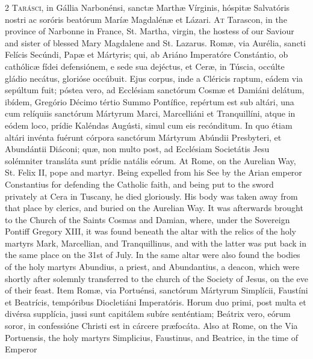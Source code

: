 \begin{paracol}{2}
\lettrine[lines=2]{T}{arásci,} in Gállia 
 Narbonénsi, sanctæ Marthæ Vírginis, hóspitæ Salvatóris nostri ac soróris 
 beatórum Maríæ Magdalénæ et Lázari.
\switchcolumn
{}
\lettrine[lines=2]{A}{t} Tarascon, in the province of 
 Narbonne in France, St. Martha, virgin, the hostess of our Saviour and 
 sister of blessed Mary Magdalene and St. Lazarus.
\switchcolumn*
{}
Romæ, via Aurélia, sancti Felícis Secúndi, Papæ et Mártyris; qui, ab Ariáno Imperatóre 
 Constántio, ob cathólicæ fídei defensiónem, e sede sua dejéctus, et 
 Ceræ, in Túscia, occúlte gládio necátus, glorióse occúbuit. Ejus 
 corpus, inde a Cléricis raptum, eádem via sepúltum fuit; póstea vero, ad 
 Ecclésiam sanctórum Cosmæ et Damiáni delátum, ibídem, Gregório Décimo tértio 
 Summo Pontífice, repértum est sub altári, una cum relíquiis sanctórum 
 Mártyrum Marci, Marcelliáni et Tranquillíni, atque in eódem loco, prídie 
 Kaléndas Augústi, simul cum eis recónditum. In quo étiam altári 
 invénta fuérunt córpora sanctórum Mártyrum Abúndii Presbyteri, et Abundántii 
 Diáconi; quæ, non multo post, ad Ecclésiam Societátis Jesu solémniter 
 transláta sunt prídie natális eórum.
\switchcolumn
{}
At Rome, on the Aurelian Way, St. 
 Felix II, pope and martyr. Being expelled from his See by the Arian 
 emperor Constantius for defending the Catholic faith, and being put to the 
 sword privately at Cera in Tuscany, he died gloriously. His body was 
 taken away from that place by clerics, and buried on the Aurelian Way. 
 It was afterwards brought to the Church of the Saints Cosmas and Damian, 
 where, under the Sovereign Pontiff Gregory XIII, it was found beneath the 
 altar with the relics of the holy martyrs Mark, Marcellian, and 
 Tranquillinus, and with the latter was put back in the same place on the 
 31st of July. In the same altar were also found the bodies of the holy 
 martyrs Abundius, a priest, and Abundantius, a deacon, which were shortly 
 after solemnly transferred to the church of the Society of Jesus, on the eve 
 of their feast.
\switchcolumn*
{}
Item Romæ, via 
 Portuénsi, sanctórum Mártyrum Simplícii, Faustíni et Beatrícis, tempóribus 
 Diocletiáni Imperatóris. Horum duo primi, post multa et divérsa 
 supplícia, jussi sunt capitálem subíre senténtiam; Beátrix vero, eórum soror, 
 in confessióne Christi est in cárcere præfocáta.
\switchcolumn
{}
Also at Rome, on the Via Portuensis, 
 the holy martyrs Simplicius, Faustinus, and Beatrice, in the time of Emperor 

\end{paracol}
